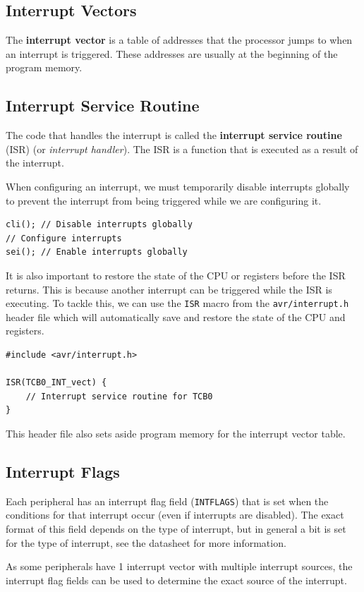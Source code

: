 \documentclass[a4paper]{report}
\begin{document}
\subsection{Interrupt Vectors}
The \textbf{interrupt vector} is a table of addresses that the processor jumps to when an interrupt is triggered.
These addresses are usually at the beginning of the program memory.
\subsection{Interrupt Service Routine}
The code that handles the interrupt is called the \textbf{interrupt service routine} (ISR) (or \textit{interrupt handler}).
The ISR is a function that is executed as a result of the interrupt.

When configuring an interrupt, we must temporarily disable interrupts globally to prevent the interrupt from being triggered while we are configuring it.
\begin{verbatim}
cli(); // Disable interrupts globally
// Configure interrupts
sei(); // Enable interrupts globally
\end{verbatim}
It is also important to restore the state of the CPU or registers before the ISR returns.
This is because another interrupt can be triggered while the ISR is executing.
To tackle this, we can use the \texttt{ISR} macro from the \texttt{avr/interrupt.h}
header file which will automatically save and restore the state of the CPU and registers.
\begin{verbatim}
#include <avr/interrupt.h>

ISR(TCB0_INT_vect) {
    // Interrupt service routine for TCB0
}
\end{verbatim}
This header file also sets aside program memory for the interrupt vector table.
\subsection{Interrupt Flags}
Each peripheral has an interrupt flag field (\texttt{INTFLAGS}) that is set when the conditions
for that interrupt occur (even if interrupts are disabled).
The exact format of this field depends on the type of interrupt, but in general a bit is
set for the type of interrupt, see the datasheet for more information.

As some peripherals have 1 interrupt vector with multiple interrupt sources,
the interrupt flag fields can be used to determine the exact source of the interrupt.
\end{document}
